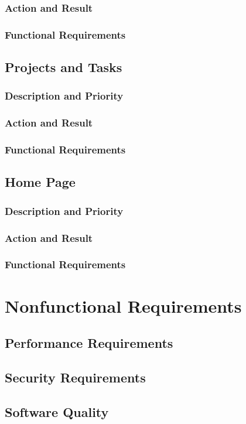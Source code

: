 \documentclass[letterpaper,10pt,titlepage,draftclsnofoot,onecolumn]{IEEEtran}
\begin{document}
\subsubsection{Action and Result}

\subsubsection{Functional Requirements}

\subsection{Projects and Tasks}

\subsubsection{Description and Priority}

\subsubsection{Action and Result}

\subsubsection{Functional Requirements}

\subsection{Home Page}

\subsubsection{Description and Priority}

\subsubsection{Action and Result}

\subsubsection{Functional Requirements}

\section{Nonfunctional Requirements}

\subsection{Performance Requirements}

\subsection{Security Requirements}

\subsection{Software Quality}
\end{document}
